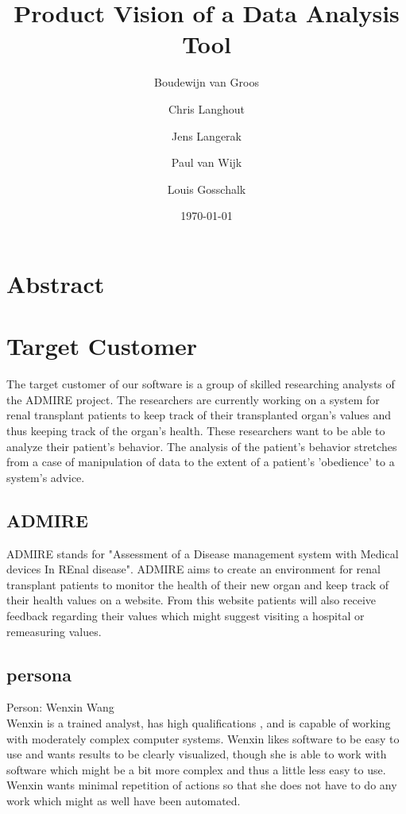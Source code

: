 \documentclass[a4paper]{article}
\title{Product Vision of a Data Analysis Tool}
\author[1]{Boudewijn van Groos}
\author[2]{Chris Langhout}
\author[3]{Jens Langerak}
\author[4]{Paul van Wijk}
\author[5]{Louis Gosschalk}
\affil[1]{bvangroos \\
4229843}
\affil[2]{clanghout \\
4281705}
\affil[3]{jlangerak \\
4317327}
\affil[4]{pvanwijk \\
4285034}
\affil[5]{lgosschalk \\
4214528}
\date{\today}
\begin{document}
\maketitle
\tableofcontents
\newpage

\section{Abstract}

\newpage

\section{Target Customer}
The target customer of our software is a group of skilled researching analysts of the ADMIRE project. The researchers are currently working on a system for renal transplant patients to keep track of their transplanted organ's values and thus keeping track of the organ's health. These researchers want to be able to analyze their patient's behavior. The analysis of the patient's behavior stretches from a case of manipulation of data to the extent of a patient's 'obedience' to a system's advice. 

\subsection{ADMIRE}
ADMIRE stands for "Assessment of a Disease management system with Medical devices In REnal disease". ADMIRE aims to create an environment for renal transplant patients to monitor the health of their new organ and keep track of their health values on a website. From this website patients will also receive feedback regarding their values which might suggest visiting a hospital or remeasuring values. \cite{Admire}

\subsection{persona}
Person: Wenxin Wang \\
Wenxin is a trained analyst, has high qualifications \cite{persona}, and is capable of working with moderately complex computer systems. Wenxin likes software to be easy to use and wants results to be clearly visualized, though she is able to work with software which might be a bit more complex and thus a little less easy to use. Wenxin wants minimal repetition of actions so that she does not have to do any work which might as well have been automated.
\end{document}
